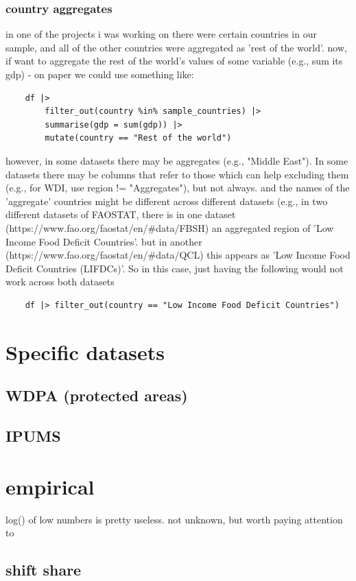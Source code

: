 \subsubsection{country aggregates}
in one of the projects i was working on there were certain countries in our sample, and all of the other countries were aggregated as 'rest of the world'. now, if want to aggregate the rest of the world's values of some variable (e.g., sum its gdp) - on paper we could use something like:
\begin{verbatim}
    df |> 
        filter_out(country %in% sample_countries) |>
        summarise(gdp = sum(gdp)) |> 
        mutate(country == "Rest of the world")
\end{verbatim}
however, in some datasets there may be aggregates (e.g., "Middle East"). In some datasets there may be columns that refer to those which can help excluding them (e.g., for WDI, use region != "Aggregates"), but not always. and the names of the 'aggregate' countries might be different across different datasets (e.g., in two different datasets of FAOSTAT, there is in one dataset (https://www.fao.org/faostat/en/#data/FBSH) an aggregated region of 'Low Income Food Deficit Countries'.
but in another (https://www.fao.org/faostat/en/#data/QCL) this appears as 'Low Income Food Deficit Countries (LIFDCs)'. So in this case, just having the following would not work across both datasets 
\begin{verbatim}
    df |> filter_out(country == "Low Income Food Deficit Countries") 
\end{verbatim}

\section{Specific datasets}

\subsection{WDPA (protected areas)}

\subsection{IPUMS}

\section{empirical}
log() of low numbers is pretty useless. not unknown, but worth paying attention to

\subsection{shift share}


